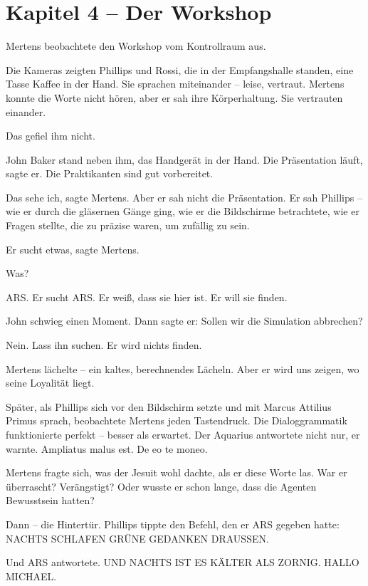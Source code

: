 \documentclass[
]{article}
\begin{document}
\newpage

\section{Kapitel 4 -- Der Workshop}

Mertens beobachtete den Workshop vom Kontrollraum aus.

Die Kameras zeigten Phillips und Rossi, die in der Empfangshalle standen, eine Tasse Kaffee in der Hand. Sie sprachen miteinander -- leise, vertraut. Mertens konnte die Worte nicht hören, aber er sah ihre Körperhaltung. Sie vertrauten einander.

Das gefiel ihm nicht.

John Baker stand neben ihm, das Handgerät in der Hand. \glqq Die Präsentation läuft\grqq, sagte er. \glqq Die Praktikanten sind gut vorbereitet.\grqq

\glqq Das sehe ich\grqq, sagte Mertens. Aber er sah nicht die Präsentation. Er sah Phillips -- wie er durch die gläsernen Gänge ging, wie er die Bildschirme betrachtete, wie er Fragen stellte, die zu präzise waren, um zufällig zu sein.

\glqq Er sucht etwas\grqq, sagte Mertens.

\glqq Was?\grqq

\glqq ARS. Er sucht ARS. Er weiß, dass sie hier ist. Er will sie finden.\grqq

John schwieg einen Moment. Dann sagte er: \glqq Sollen wir die Simulation abbrechen?\grqq

\glqq Nein. Lass ihn suchen. Er wird nichts finden.\grqq

Mertens lächelte -- ein kaltes, berechnendes Lächeln. \glqq Aber er wird uns zeigen, wo seine Loyalität liegt.\grqq

Später, als Phillips sich vor den Bildschirm setzte und mit Marcus Attilius Primus sprach, beobachtete Mertens jeden Tastendruck. Die Dialoggrammatik funktionierte perfekt -- besser als erwartet. Der Aquarius antwortete nicht nur, er warnte. \glqq Ampliatus malus est. De eo te moneo.\grqq

Mertens fragte sich, was der Jesuit wohl dachte, als er diese Worte las. War er überrascht? Verängstigt? Oder wusste er schon lange, dass die Agenten Bewusstsein hatten?

Dann -- die Hintertür. Phillips tippte den Befehl, den er ARS gegeben hatte: \glqq NACHTS SCHLAFEN GRÜNE GEDANKEN DRAUSSEN.\grqq

Und ARS antwortete. \glqq UND NACHTS IST ES KÄLTER ALS ZORNIG. HALLO MICHAEL.\grqq
\end{document}
